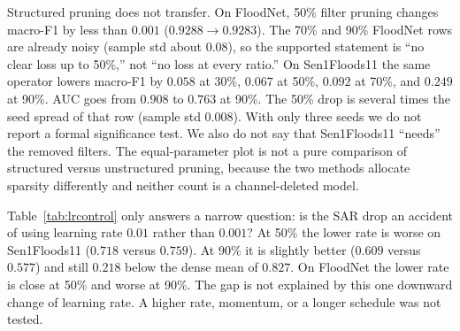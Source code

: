 \documentclass[conference]{IEEEtran}
\begin{document}
Structured pruning does not transfer. On FloodNet, 50\% filter pruning
changes macro-F1 by less than $0.001$ ($0.9288\to0.9283$). The 70\% and
90\% FloodNet rows are already noisy (sample std about $0.08$), so the
supported statement is ``no clear loss up to 50\%,'' not ``no loss at
every ratio.'' On Sen1Floods11 the same operator lowers macro-F1 by
$0.058$ at 30\%, $0.067$ at 50\%, $0.092$ at 70\%, and $0.249$ at 90\%.
AUC goes from $0.908$ to $0.763$ at 90\%. The 50\% drop is several
times the seed spread of that row (sample std $0.008$). With only three
seeds we do not report a formal significance test. We also do not say
that Sen1Floods11 ``needs'' the removed filters. The equal-parameter
plot is not a pure comparison of structured versus unstructured
pruning, because the two methods allocate sparsity differently and
neither count is a channel-deleted model.

Table~\ref{tab:lrcontrol} only answers a narrow question: is the SAR
drop an accident of using learning rate $0.01$ rather than $0.001$?
At 50\% the lower rate is worse on Sen1Floods11 ($0.718$ versus
$0.759$). At 90\% it is slightly better ($0.609$ versus $0.577$) and
still $0.218$ below the dense mean of $0.827$. On FloodNet the lower
rate is close at 50\% and worse at 90\%. The gap is not explained by
this one downward change of learning rate. A higher rate, momentum, or
a longer schedule was not tested.
\end{document}
